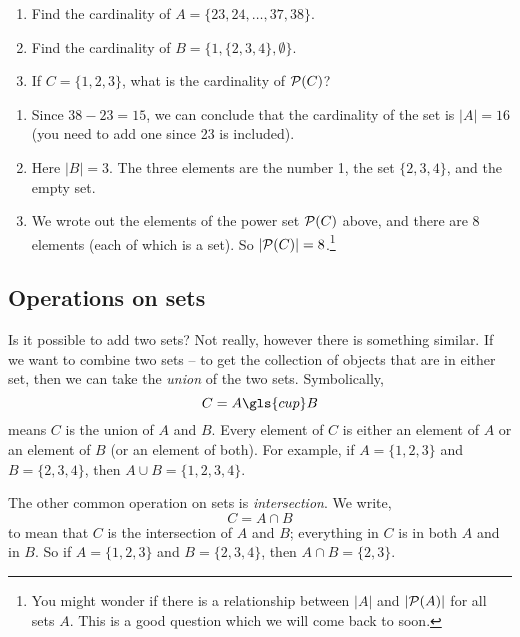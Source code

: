 \documentclass[12pt]{article}
\begin{document}
\begin{example}
\begin{enumerate}
\item Find the cardinality of $A = \{23, 24, \ldots, 37, 38\}$.
\item Find the cardinality of $B = \{1, \{2, 3, 4\}, \emptyset\}$.
\item If $C = \{1,2,3\}$, what is the cardinality of $\mathcal P(C)$?
\end{enumerate}
  
\begin{solution}
\begin{enumerate}
\item Since $38 - 23 = 15$, we can conclude that the cardinality of the set is $|A| = 16$ (you need to add one since 23 is included).
\item Here $|B| = 3$.  The three elements are the number 1, the set $\{2,3,4\}$, and the empty set.  
\item We wrote out the elements of the power set $\mathcal P(C)$ above, and there are 8 elements (each of which is a set).  So $|\mathcal P(C)| = 8$.\footnote{You might wonder if there is a relationship between $|A|$ and $|\mathcal P(A)|$ for all sets $A$.  This is a good question which we will come back to soon.}
\end{enumerate}
 
\end{solution}
\end{example}

\subsection{Operations on sets}

Is it possible to add two sets?  Not really, however there is something similar.  If we want to combine two sets -- to get the collection of objects that are in either set, then we can take the \emph{union} of the two sets.  Symbolically,
\[ C = A \gls{cup} B\]
means $C$ is the union of $A$ and $B$.  Every element of $C$ is either an element of $A$ or an element of $B$ (or an element of both).  For example, if $A = \{1, 2, 3\}$ and $B = \{2, 3, 4\}$, then $A \cup B = \{1, 2, 3, 4\}$.

The other common operation on sets is \emph{intersection}.  We write,
\[ C = A \cap B\]
to mean that $C$ is the intersection of $A$ and $B$; everything in $C$ is in both $A$ and in $B$.  So if $A = \{1, 2, 3\}$ and $B = \{2, 3, 4\}$, then $A \cap B = \{2, 3\}$.  
\end{document}
